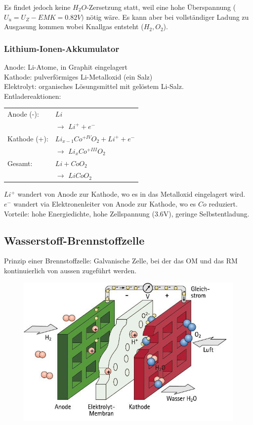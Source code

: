 Es findet jedoch keine $H_2O$-Zersetzung statt, weil eine hohe Überspannung ($U_{\ddot{u}} = U_Z-EMK=0.82V)$ nötig wäre. Es kann aber bei vollständiger Ladung zu Ausgasung kommen wobei Knallgas entsteht ($H_2,O_2$).

\subsubsection{Lithium-Ionen-Akkumulator}
Anode: Li-Atome, in Graphit eingelagert \\
Kathode: pulverförmiges Li-Metalloxid (ein Salz) \\
Elektrolyt: organisches Lösungsmittel mit gelöstem Li-Salz. \\

Entladereaktionen:
\begin{table}[htbp]
	\begin{tabular}{ll}
		Anode (-): & $Li$ \\ &\qquad $\rightarrow$  $Li^+ + e^-$ \\
		Kathode (+): & $Li_{x-1}Co^{+IV}O_2 + Li^+ + e^-$ \\ &\qquad $\rightarrow$ $Li_xCo^{+III}O_2$ \\ \hline
		Gesamt: & $Li + CoO_2$ \\ &\qquad $\rightarrow$  $LiCoO_2$
	\end{tabular}
\end{table}

$Li^+$ wandert von Anode zur Kathode, wo es in das Metalloxid eingelagert wird. $e^-$ wandert via Elektronenleiter von Anode zur Kathode, wo es $Co$ reduziert. \\

Vorteile: hohe Energiedichte, hohe Zellspannung (3.6V), geringe Selbstentladung. \\

\subsection{Wasserstoff-Brennstoffzelle}
Prinzip einer Brennstoffzelle: Galvanische Zelle, bei der das OM und das RM kontinuierlich von aussen zugeführt werden. \\

\begin{figure}[htbp]
	\centering
	\includegraphics[width=0.6\linewidth]{images/10_Wasserstoffzelle.png}
\end{figure}

